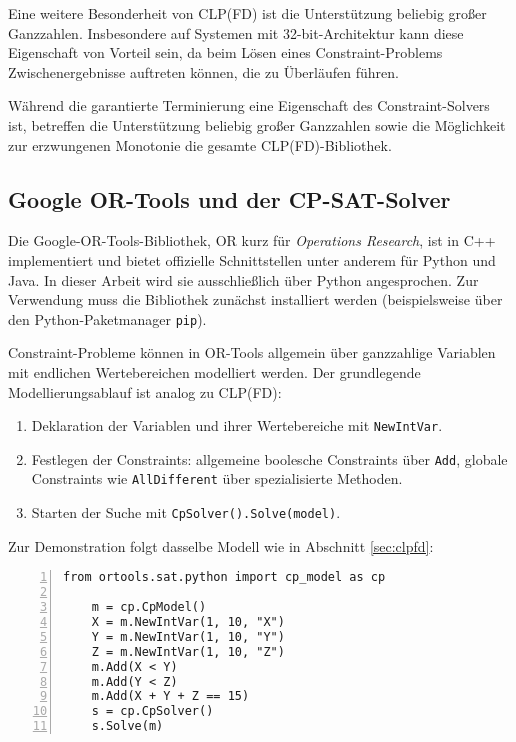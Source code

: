 \documentclass[12pt,a4paper]{article}
\begin{document}
Eine weitere Besonderheit von CLP(FD) ist die Unterstützung beliebig großer Ganzzahlen.
Insbesondere auf Systemen mit 32-bit-Architektur kann diese Eigenschaft von Vorteil sein, da beim Lösen eines Constraint-Problems Zwischenergebnisse auftreten können, die zu Überläufen führen.

Während die garantierte Terminierung eine Eigenschaft des Constraint-Solvers ist, betreffen die Unterstützung beliebig großer Ganzzahlen sowie die Möglichkeit zur erzwungenen Monotonie die gesamte CLP(FD)-Bibliothek.

\subsection{Google OR-Tools und der CP-SAT-Solver}
\label{sec:ortools}
Die Google-OR-Tools-Bibliothek, \glqq OR\grqq{} kurz für \emph{Operations Research}, ist in C++ implementiert und bietet offizielle Schnittstellen unter anderem für Python und Java.
In dieser Arbeit wird sie ausschließlich über Python angesprochen.
Zur Verwendung muss die Bibliothek zunächst installiert werden (beispielsweise über den Python-Paketmanager \texttt{pip}).

Constraint-Probleme können in OR-Tools allgemein über ganzzahlige Variablen mit endlichen Wertebereichen modelliert werden.
Der grundlegende Modellierungsablauf ist analog zu CLP(FD):

\begin{enumerate}
    \item Deklaration der Variablen und ihrer Wertebereiche mit \texttt{NewIntVar}.
    \item Festlegen der Constraints: allgemeine boolesche Constraints über \texttt{Add}, globale Constraints wie \texttt{AllDifferent} über spezialisierte Methoden.
    \item Starten der Suche mit \texttt{CpSolver().Solve(model)}.
\end{enumerate}

\noindent
Zur Demonstration folgt dasselbe Modell wie in Abschnitt \ref{sec:clpfd}:

\begin{Verbatim}[numbers=left, xleftmargin=5mm, frame=lines]
    from ortools.sat.python import cp_model as cp

    m = cp.CpModel()
    X = m.NewIntVar(1, 10, "X")
    Y = m.NewIntVar(1, 10, "Y")
    Z = m.NewIntVar(1, 10, "Z")
    m.Add(X < Y)
    m.Add(Y < Z)
    m.Add(X + Y + Z == 15)
    s = cp.CpSolver()
    s.Solve(m)

\end{Verbatim}
\end{document}

